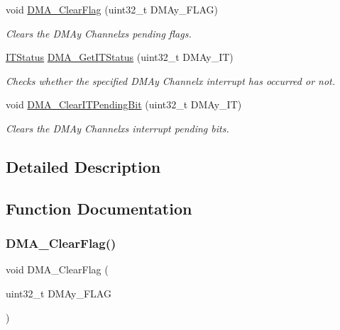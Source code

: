 \begin{DoxyCompactItemize}
void \mbox{\hyperlink{group___d_m_a___private___functions_ga25cdca360f309c8ceb7c206cd9ad9119}{D\+M\+A\+\_\+\+Clear\+Flag}} (uint32\+\_\+t D\+M\+Ay\+\_\+\+F\+L\+AG)
\begin{DoxyCompactList}\small\item\em Clears the D\+M\+Ay Channelx\textquotesingle{}s pending flags. \end{DoxyCompactList}\item 
\mbox{\hyperlink{group___exported__types_gaacbd7ed539db0aacd973a0f6eca34074}{I\+T\+Status}} \mbox{\hyperlink{group___d_m_a___private___functions_ga9287331247150fe84d03ecd7ad8adb52}{D\+M\+A\+\_\+\+Get\+I\+T\+Status}} (uint32\+\_\+t D\+M\+Ay\+\_\+\+IT)
\begin{DoxyCompactList}\small\item\em Checks whether the specified D\+M\+Ay Channelx interrupt has occurred or not. \end{DoxyCompactList}\item 
void \mbox{\hyperlink{group___d_m_a___private___functions_ga91a7340e5b334a942f3eb1e05ed5f67a}{D\+M\+A\+\_\+\+Clear\+I\+T\+Pending\+Bit}} (uint32\+\_\+t D\+M\+Ay\+\_\+\+IT)
\begin{DoxyCompactList}\small\item\em Clears the D\+M\+Ay Channelx\textquotesingle{}s interrupt pending bits. \end{DoxyCompactList}\end{DoxyCompactItemize}


\subsection{Detailed Description}


\subsection{Function Documentation}
\mbox{\label{group___d_m_a___private___functions_ga25cdca360f309c8ceb7c206cd9ad9119}} 
\subsubsection{\texorpdfstring{DMA\_ClearFlag()}{DMA\_ClearFlag()}}
{\footnotesize\ttfamily void D\+M\+A\+\_\+\+Clear\+Flag (\begin{DoxyParamCaption}\item[{uint32\+\_\+t}]{D\+M\+Ay\+\_\+\+F\+L\+AG }\end{DoxyParamCaption})}



